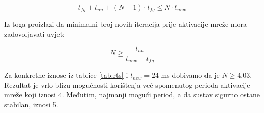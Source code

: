 \begin{equation}
    t_{fg} + t_{nn} + (N - 1) \cdot t_{fg} \leq N \cdot t_{new}
\end{equation}

Iz toga proizlazi da minimalni broj novih iteracija prije aktivacije mreže mora zadovoljavati
uvjet:

\begin{equation}
    N \geq \frac{t_{nn}}{t_{new} - t_{fg}}
\end{equation}

Za konkretne iznose iz tablice \ref{tab:rts} i $t_{new} = 24$ ms dobivamo da je 
$N \geq 4.03$. Rezultat je vrlo blizu mogućnosti korištenja već spomenutog
perioda aktivacije mreže koji iznosi 4. Međutim, najmanji mogući period, a da sustav 
sigurno ostane stabilan, iznosi 5.